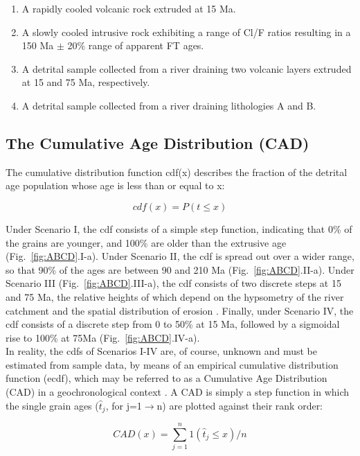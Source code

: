 \documentclass{article}
\begin{document}
\begin{enumerate}[label=\Alph*.]
\item A rapidly cooled volcanic rock extruded at 15 Ma.
\item A slowly cooled intrusive rock exhibiting a range of Cl/F ratios
  resulting in a 150 Ma $\pm$ 20\% range of apparent FT ages.
\item A detrital sample collected from a river draining two volcanic
  layers extruded at 15 and 75 Ma, respectively.
\item A detrital sample collected from a river draining lithologies A
  and B.
\end{enumerate}

\subsection{The Cumulative Age Distribution (CAD)}

The cumulative distribution function cdf(x) describes the fraction of
the detrital age population whose age is less than or equal to x:

\begin{equation}
cdf(x) = P(t \leq x)
\end{equation}

Under Scenario I, the cdf consists of a simple step function,
indicating that 0\% of the grains are younger, and 100\% are older
than the extrusive age (Fig.~\ref{fig:ABCD}.I-a).  Under Scenario II,
the cdf is spread out over a wider range, so that 90\% of the ages are
between 90 and 210 Ma (Fig.~\ref{fig:ABCD}.II-a). Under Scenario III
(Fig.~\ref{fig:ABCD}.III-a), the cdf consists of two discrete steps at
15 and 75 Ma, the relative heights of which depend on the hypsometry
of the river catchment and the spatial distribution of erosion
\citep{vermeesch2007a}.  Finally, under Scenario IV, the cdf consists
of a discrete step from 0 to 50\% at 15 Ma, followed by a sigmoidal
rise to 100\% at 75Ma (Fig.~\ref{fig:ABCD}.IV-a).\\

In reality, the cdfs of Scenarios I-IV are, of course, unknown and
must be estimated from sample data, by means of an empirical
cumulative distribution function (ecdf), which may be referred to as a
Cumulative Age Distribution (CAD) in a geochronological context
\citep{vermeesch2007a}. A CAD is simply a step function in which the
single grain ages ($\hat{t}_j$, for j=1$\rightarrow$n) are plotted
against their rank order:

\begin{equation}
CAD(x) = \sum_{j=1}^{n} 1(\hat{t}_j \leq x)/n
\end{equation}
\end{document}
